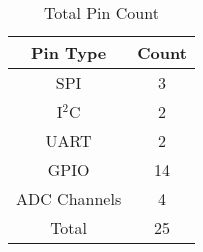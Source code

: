 \begin{table}[H]
\setlength{\extrarowheight}{1.5pt}
  \centering
  \caption{Total Pin Count}
    \begin{tabular}{|c|c|}
    \hline
    Pin Type  & Count \\
    \hline \hline
   	SPI & 3 \\ \hline
   	I$^2$C & 2 \\ \hline
   	UART & 2 \\ \hline
   	GPIO & 14 \\ \hline
   	ADC Channels & 4 \\ \hline \hline
   	Total & 25\\ \hline
    \end{tabular}%
  \label{tab:pinCountTotal}%
\end{table}%

